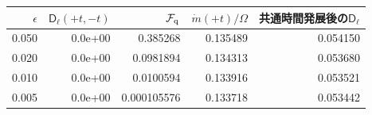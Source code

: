 \begin{tabular}{rrrrr}\toprule
$\epsilon$ & $\mathsf D_{\ell}(+t,-t)$ & $\mathcal F_{\rm q}$ & $\dot m(+t)/\Omega$ & 共通時間発展後の$\mathsf D_{\ell}$\\\midrule
0.050 & 0.0e+00 & 0.385268 & 0.135489 & 0.054150 \\
0.020 & 0.0e+00 & 0.0981894 & 0.134313 & 0.053680 \\
0.010 & 0.0e+00 & 0.0100594 & 0.133916 & 0.053521 \\
0.005 & 0.0e+00 & 0.000105576 & 0.133718 & 0.053442 \\
\bottomrule\end{tabular}
